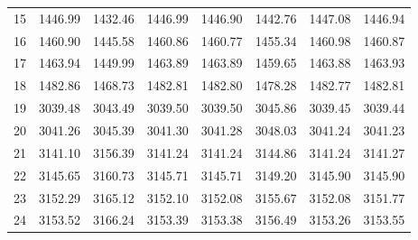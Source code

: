 \documentclass[10pt,oneside]{article}
\begin{document}
\begin{table}[h!]
\begin{tabular}{cccccccc}
15 &   1446.99 & 1432.46 & 1446.99 &    1446.90 &      1442.76 & 1447.08 &   1446.94 \\
16 &   1460.90 & 1445.58 & 1460.86 &    1460.77 &      1455.34 & 1460.98 &   1460.87 \\
17 &   1463.94 & 1449.99 & 1463.89 &    1463.89 &      1459.65 & 1463.88 &   1463.93 \\
18 &   1482.86 & 1468.73 & 1482.81 &    1482.80 &      1478.28 & 1482.77 &   1482.81 \\
19 &   3039.48 & 3043.49 & 3039.50 &    3039.50 &      3045.86 & 3039.45 &   3039.44 \\
20 &   3041.26 & 3045.39 & 3041.30 &    3041.28 &      3048.03 & 3041.24 &   3041.23 \\
21 &   3141.10 & 3156.39 & 3141.24 &    3141.24 &      3144.86 & 3141.24 &   3141.27 \\
22 &   3145.65 & 3160.73 & 3145.71 &    3145.71 &      3149.20 & 3145.90 &   3145.90 \\
23 &   3152.29 & 3165.12 & 3152.10 &    3152.08 &      3155.67 & 3152.08 &   3151.77 \\
24 &   3153.52 & 3166.24 & 3153.39 &    3153.38 &      3156.49 & 3153.26 &   3153.55 \\
\bottomrule
\end{tabular}
\end{table}
\end{document}
